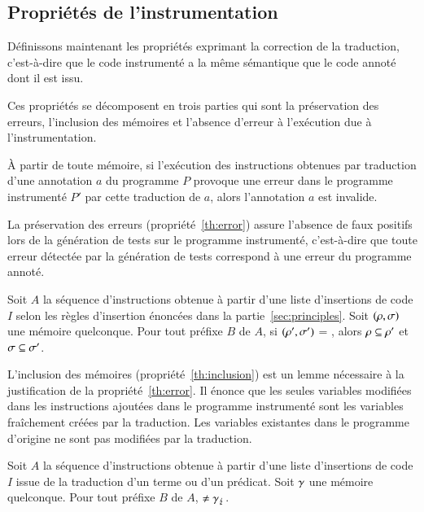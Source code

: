 \subsection{Propriétés de l'instrumentation}
\label{sec:properties}


Définissons maintenant les propriétés exprimant la correction de la traduction,
c'est-à-dire que le code instrumenté a la même sémantique que le code annoté
dont il est issu.

Ces propriétés se décomposent en trois parties qui sont la préservation des
erreurs, l'inclusion des mémoires et l'absence d'erreur à l'exécution due à
l'instrumentation.

\begin{myproperty}
  \label{th:error}
  À partir de toute mémoire, si l'exécution des instructions obtenues
  par traduction d'une annotation $a$
  du programme $P$ provoque une erreur dans le programme instrumenté $P'$ par
  cette traduction de $a$, alors l'annotation $a$ est invalide.
\end{myproperty}

La préservation des erreurs (propriété~\ref{th:error}) assure l'absence de faux
positifs lors de la génération de tests sur le programme instrumenté,
c'est-à-dire que toute erreur détectée par la génération de tests correspond à
une erreur du programme annoté.

\begin{myproperty}
  \label{th:inclusion}
  Soit $A$ la séquence d'instructions obtenue à partir d'une liste d'insertions
  de code $I$ selon les règles d'insertion énoncées dans la
  partie~\ref{sec:principles}.
  Soit $(\rho, \sigma)$ une mémoire quelconque.
  Pour tout préfixe $B$ de $A$, si
  $(\rho', \sigma')$ = , alors
  $\rho \subseteq \rho'$ et $\sigma \subseteq \sigma'$.
\end{myproperty}

L'inclusion des mémoires (propriété~\ref{th:inclusion}) est un lemme
nécessaire à la justification de la propriété~\ref{th:error}.
Il énonce que les seules variables modifiées dans les instructions ajoutées dans
le programme instrumenté sont les variables fraîchement créées par la
traduction.
Les variables existantes dans le programme d'origine ne sont pas modifiées par
la traduction.

\begin{myproperty}
  \label{lem:noerror}
  Soit $A$ la séquence d'instructions obtenue à partir d'une liste d'insertions
  de code $I$ issue de la traduction d'un terme ou d'un prédicat.
  Soit $\gamma$ une mémoire quelconque.
  Pour tout préfixe $B$ de $A$,  $\neq \gamma_\lightning$.
\end{myproperty}


